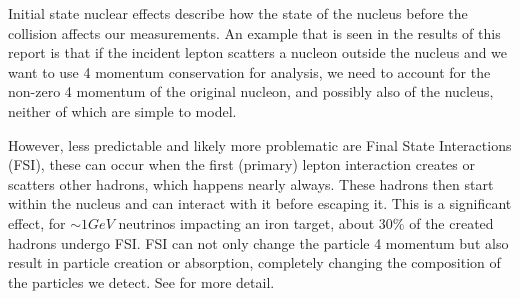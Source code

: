 \documentclass[a4paper,12pt]{article}
\newcommand{\efn}{e4$\nu$}
\begin{document}
Initial state nuclear effects describe how the state of the nucleus before the collision affects our measurements.
An example that is seen in the results of this report is that if the incident lepton scatters a nucleon outside the nucleus and we want to use 4 momentum conservation for analysis, we need to account for the non-zero 4 momentum of the original nucleon, and possibly also of the nucleus, neither of which are simple to model.

However, less predictable and likely more problematic are Final State Interactions (FSI), these can occur when the first (primary) lepton interaction creates or scatters other hadrons, which happens nearly always.
These hadrons then start within the nucleus and can interact with it before escaping it.
This is a significant effect, for $\sim 1\si{GeV}$ neutrinos impacting an iron target, about 30\% of the created hadrons undergo FSI\cite{stevendytmanFinalStateInteractions2009}.
FSI can not only change the particle 4 momentum but also result in particle creation or absorption, completely changing the composition of the particles we detect.
See \cite{golanEffectsFinalstateInteractions2012,stevendytmanFinalStateInteractions2009} for more detail.



\end{document}
